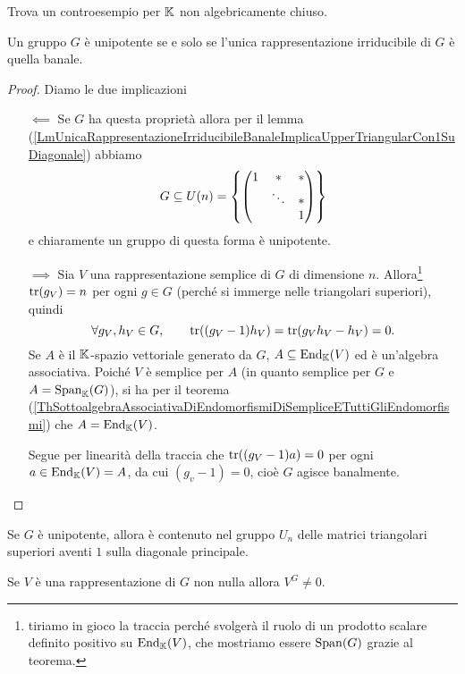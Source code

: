 \begin{exercise}
Trova un controesempio per $\mathbb{K}$ non algebricamente chiuso.
\end{exercise}



\begin{theorem}\label{ThUnipotenteSeESoloSeUnicaRappresentazioneIrriducibileEBanale}
    Un gruppo $G$ è unipotente se e solo se l'unica rappresentazione irriducibile di $G$ è quella banale.
\end{theorem}
\begin{proof}
Diamo le due implicazioni
\setlength{\leftmargini}{0cm}
\begin{itemize}
\item[$\boxed{\impliedby}$] Se $G$ ha questa propriet\`a allora per il lemma (\ref{LmUnicaRappresentazioneIrriducibileBanaleImplicaUpperTriangularCon1SuDiagonale}) abbiamo
\[G\subseteq U(n)=\left\{ \begin{pmatrix}1 & \ast & \ast\\ &\ddots &\ast\\ &&1\end{pmatrix}\right\}\]
e chiaramente un gruppo di questa forma \`e unipotente.
\item[$\boxed{\implies}$] Sia $V$ una rappresentazione semplice di $G$ di dimensione $n$. Allora\footnote{tiriamo in gioco la traccia perch\'e svolger\`a il ruolo di un prodotto scalare definito positivo su $\operatorname{End}_{\mathbb{K}}(V)$, che mostriamo essere $\operatorname{Span}(G)$ grazie al teorema.} $\operatorname{tr}(g_V)=n$ per ogni $g\in G$ (perch\'e si immerge nelle triangolari superiori), quindi
\[\forall g_V,h_V\in G,\qquad \operatorname{tr}((g_V-1)h_V)=\operatorname{tr}(g_Vh_V-h_V)=0.\]
Se $A$ \`e il $\mathbb{K}$-spazio vettoriale generato da $G$, $A\subseteq \operatorname{End}_{\mathbb{K}}(V)$ ed \`e un'algebra associativa. Poich\'e $V$ \`e semplice per $A$ (in quanto semplice per $G$ e $A=\operatorname{Span}_{\mathbb{K}}(G)$), si ha per il teorema (\ref{ThSottoalgebraAssociativaDiEndomorfismiDiSempliceETuttiGliEndomorfismi}) che $A=\operatorname{End}_{\mathbb{K}}(V)$.

Segue per linearit\`a della traccia che $\operatorname{tr}((g_V-1)a)=0$ per ogni $a\in \operatorname{End}_{\mathbb{K}}(V)=A$, da cui $(g_v-1)=0$, cio\`e $G$ agisce banalmente.
\end{itemize}
\setlength{\leftmargini}{0.5cm}
\end{proof}

\begin{corollary}
    Se $G$ è unipotente, allora è contenuto nel gruppo $U_n$ delle matrici triangolari superiori aventi $1$ sulla diagonale principale.
\end{corollary}

\begin{corollary}\label{CorFissatoDaUnipotenteNonEBanale}
    Se $V$ \`e una rappresentazione di $G$ non nulla allora $V^G\neq 0$.
\end{corollary}

